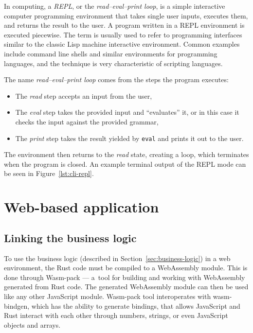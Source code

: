 \documentclass[english,bachelors,forcepolishlogotype]{wizthesis}
\begin{document}
In computing, a \emph{REPL}, or the \emph{read–eval–print loop}, is a simple
interactive computer programming environment that takes single user inputs,
executes them, and returns the result to the user. A program written in a REPL
environment is executed piecewise. The term is usually used to refer to
programming interfaces similar to the classic Lisp machine interactive
environment. Common examples include command line shells and similar
environments for programming languages, and the technique is very characteristic
of scripting languages.

The name \emph{read–eval–print loop} comes from the steps the program executes:
\begin{itemize}
  \item The \emph{read} step accepts an input from the user,
  \item The \emph{eval} step takes the provided input and ``evaluates'' it,
  or in this case it checks the input against the provided grammar,
  \item The \emph{print} step takes the result yielded by \texttt{eval} and
  prints it out to the user.
\end{itemize}
The environment then returns to the \emph{read} state, creating a loop, which
terminates when the program is closed. An example terminal output of the REPL
mode can be seen in Figure~\ref{lst:cli-repl}.

\section{Web-based application} \label{sec:web-based-application}

\subsection{Linking the business logic}

To use the business logic (described in Section~\ref{sec:business-logic}) in a
web environment, the Rust code must be compiled to a WebAssembly module. This is
done through Wasm-pack --- a~tool for building and working with WebAssembly
generated from Rust code. The generated WebAssembly module can then be used like
any other JavaScript module. Wasm-pack tool interoperates with wasm-bindgen,
which has the ability to generate bindings, that allows JavaScript and Rust
interact with each other through numbers, strings, or even JavaScript objects
and arrays.
\end{document}
